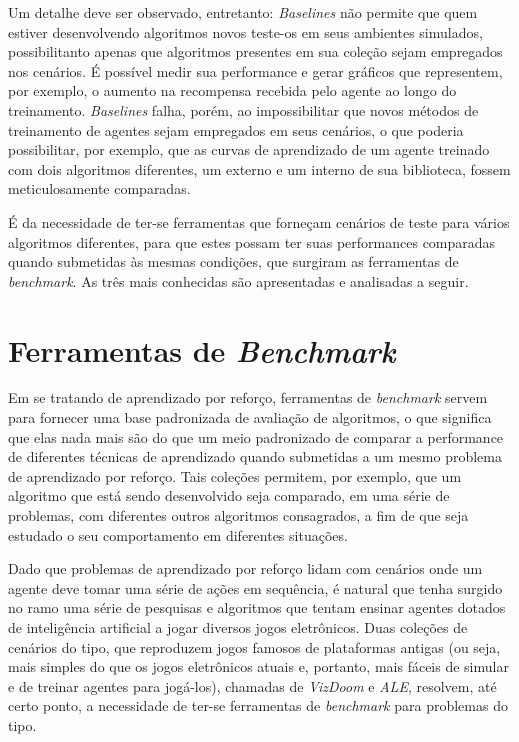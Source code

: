 \documentclass[cic,tc]{iiufrgs}
\begin{document}
Um detalhe deve ser observado, entretanto: \textit{Baselines} não permite que
quem estiver desenvolvendo algoritmos novos teste-os em seus ambientes
simulados, possibilitanto apenas que algoritmos presentes em sua coleção sejam
empregados nos cenários. É possível medir sua performance e gerar gráficos que
representem, por exemplo, o aumento na recompensa recebida pelo agente ao longo
do treinamento. \textit{Baselines} falha, porém, ao impossibilitar que novos
métodos de treinamento de agentes sejam empregados em seus cenários, o que
poderia possibilitar, por exemplo, que as curvas de aprendizado de um agente
treinado com dois algoritmos diferentes, um externo e um interno de sua
biblioteca, fossem meticulosamente comparadas.


É da necessidade de ter-se ferramentas que forneçam cenários de teste para
vários algoritmos diferentes, para que estes possam ter suas performances
comparadas quando submetidas às mesmas condições, que surgiram as ferramentas de
\textit{benchmark}. As três mais conhecidas são apresentadas e analisadas a
seguir.


\section{Ferramentas de \textit{Benchmark}}

Em se tratando de aprendizado por reforço, ferramentas de \textit{benchmark}
servem para fornecer uma base padronizada de avaliação de algoritmos, o que
significa que elas nada mais são do que um meio padronizado de comparar a
performance de diferentes técnicas de aprendizado quando submetidas a um mesmo
problema de aprendizado por reforço. Tais coleções permitem, por exemplo, que
um algoritmo que está sendo desenvolvido seja comparado, em uma série de
problemas, com diferentes outros algoritmos consagrados, a fim de que seja
estudado o seu comportamento em diferentes situações.


Dado que problemas de aprendizado por reforço lidam com cenários onde um agente
deve tomar uma série de ações em sequência, é natural que tenha surgido no ramo
uma série de pesquisas e algoritmos que tentam ensinar agentes dotados de
inteligência artificial a jogar diversos jogos eletrônicos. Duas coleções de
cenários do tipo, que reproduzem jogos famosos de plataformas antigas (ou seja,
mais simples do que os jogos eletrônicos atuais e, portanto, mais fáceis de
simular e de treinar agentes para jogá-los), chamadas de \textit{VizDoom} e
\textit{ALE}, resolvem, até certo ponto, a necessidade de ter-se ferramentas
de \textit{benchmark} para problemas do tipo.
\end{document}
